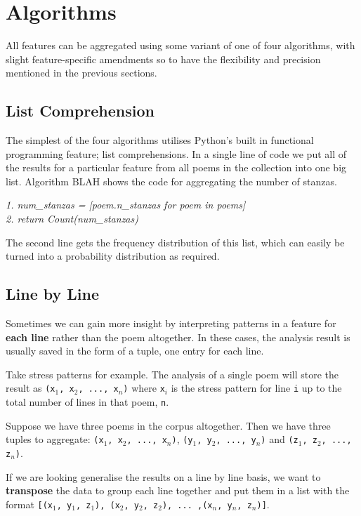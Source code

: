 \section{Algorithms}

All features can be aggregated using some variant of one of four algorithms, with slight feature-specific amendments so to have the flexibility and precision mentioned in the previous sections.

\subsection{List Comprehension}
\label{sec:listcomp}

The simplest of the four algorithms utilises Python's built in functional programming feature; list comprehensions. In a single line of code we put all of the results for a particular feature from all poems in the collection into one big list. Algorithm BLAH shows the code for aggregating the number of stanzas.

\textit{
1. num\_stanzas = [poem.n\_stanzas for poem in poems]\\
2. return Count(num\_stanzas)
}

The second line gets the frequency distribution of this list, which can easily be turned into a probability distribution as required.


\subsection{Line by Line}

Sometimes we can gain more insight by interpreting patterns in a feature for \textbf{each line} rather than the poem altogether. In these cases, the analysis result is usually saved in the form of a tuple, one entry for each line.

Take stress patterns for example. The analysis of a single poem will store the result as \texttt{(x$_1$, x$_2$, ..., x$_n$)} where \texttt{x$_i$} is the stress pattern for line \texttt{i} up to the total number of lines in that poem, \texttt{n}.

Suppose we have three poems in the corpus altogether. Then we have three tuples to aggregate: \texttt{(x$_1$, x$_2$, ..., x$_n$)}, \texttt{(y$_1$, y$_2$, ..., y$_n$)} and \texttt{(z$_1$, z$_2$, ..., z$_n$)}. 

If we are looking generalise the results on a line by line basis, we want to \textbf{transpose} the data to group each line together and put them in a list with the format \texttt{[(x$_1$, y$_1$, z$_1$), (x$_2$, y$_2$, z$_2$), ... ,(x$_n$, y$_n$, z$_n$)]}.


